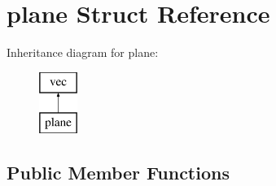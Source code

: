 \hypertarget{structplane}{}\section{plane Struct Reference}
\label{structplane}
Inheritance diagram for plane\+:\begin{figure}[H]
\begin{center}
\leavevmode
\includegraphics[height=2.000000cm]{structplane}
\end{center}
\end{figure}
\subsection*{Public Member Functions}

